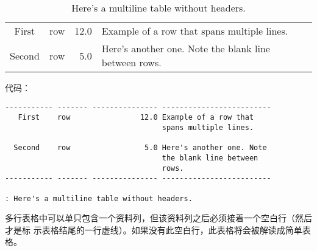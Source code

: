 \documentclass[fancyhdr,bookmark]{ctexbook}
\begin{document}
\begin{longtable}[c]{@{}clrl@{}}
\caption{Here's a multiline table without headers.}\tabularnewline
\toprule
\endfirsthead
\toprule
\begin{minipage}[t]{0.15\columnwidth}\centering\strut
First
\strut\end{minipage} &
\begin{minipage}[t]{0.10\columnwidth}\raggedright\strut
row
\strut\end{minipage} &
\begin{minipage}[t]{0.20\columnwidth}\raggedleft\strut
12.0
\strut\end{minipage} &
\begin{minipage}[t]{0.31\columnwidth}\raggedright\strut
Example of a row that spans multiple lines.
\strut\end{minipage}\tabularnewline
\begin{minipage}[t]{0.15\columnwidth}\centering\strut
Second
\strut\end{minipage} &
\begin{minipage}[t]{0.10\columnwidth}\raggedright\strut
row
\strut\end{minipage} &
\begin{minipage}[t]{0.20\columnwidth}\raggedleft\strut
5.0
\strut\end{minipage} &
\begin{minipage}[t]{0.31\columnwidth}\raggedright\strut
Here's another one. Note the blank line between rows.
\strut\end{minipage}\tabularnewline
\bottomrule
\end{longtable}

代码：

\begin{lstlisting}
----------- ------- --------------- -------------------------
   First    row                12.0 Example of a row that
                                    spans multiple lines.

  Second    row                 5.0 Here's another one. Note
                                    the blank line between
                                    rows.
----------- ------- --------------- -------------------------

: Here's a multiline table without headers.
\end{lstlisting}

多行表格中可以单只包含一个资料列，但该资料列之后必须接着一个空白行（然后才是标
示表格结尾的一行虚线）。如果没有此空白行，此表格将会被解读成简单表格。
\end{document}
